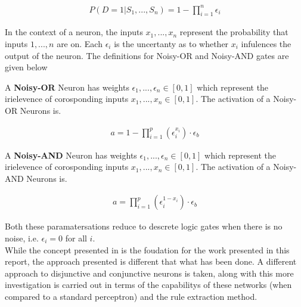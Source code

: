 \begin{align}
P(D = 1 | S_1, ..., S_n) = 1 - \prod^n_{i=1} \epsilon_i
\end{align}

In the context of a neuron, the inputs $x_1, ..., x_n$ represent the probability that inputs $1, ..., n$ are on. Each $\epsilon_i$ is the uncertanty as to whether $x_i$ infulences the output of the neuron. The definitions for Noisy-OR and Noisy-AND gates are given below

\begin{definition}
A \textbf{Noisy-OR} Neuron has weights $\epsilon_1, ..., \epsilon_n \in [0,1]$ which represent the irielevence of corosponding inputs $x_1, ..., x_n \in [0,1]$. The activation of a Noisy-OR Neurons is.

\begin{align}
a = 1 - \prod^p_{i=1} (\epsilon_i^{x_i}) \cdot \epsilon_b
\label{equ:noisy-or-activation-1}
\end{align}
\end{definition}

\begin{definition}
A \textbf{Noisy-AND} Neuron has weights $\epsilon_1, ..., \epsilon_n \in [0, 1]$ which represent the irielevence of corosponding inputs $x_1, ..., x_n \in [0,1]$. The activation of a Noisy-AND Neurons is.

\begin{align}
a = \prod^p_{i=1} (\epsilon_i^{1 - x_i}) \cdot \epsilon_b
\label{equ:noisy-or-activation-1}
\end{align}
\end{definition}

Both these paramatersations reduce to descrete logic gates when there is no noise, i.e. $\epsilon_i = 0$ for all $i$.\\

While the concept presented in \cite{herrmann1996backpropagation} is the foudation for the work presented in this report, the approach presented is different that what has been done. A different approach to disjunctive and conjunctive neurons is taken, along with this more investigation is carried out in terms of the capabilitys of these networks (when compared to a standard perceptron) and the rule extraction method.